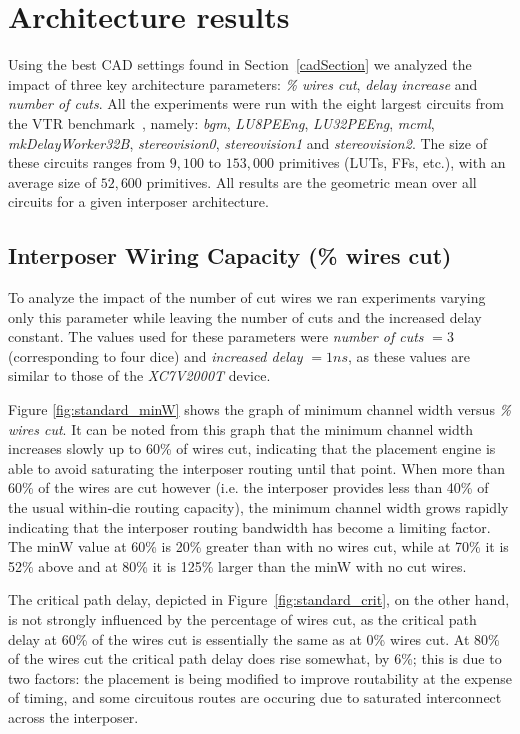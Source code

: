 \documentclass{sig-alternate-2013}
\begin{document}
\section{Architecture results}
\label{resultsSection}

Using the best CAD settings found in Section~\ref{cadSection} we analyzed the impact of three key architecture parameters:  \textit{\% wires cut}, \textit{delay increase} and \textit{number of cuts}. All the experiments were run with the eight largest circuits from the VTR benchmark~\cite{vtr2012}, namely: \textit{bgm}, \textit{LU8PEEng}, \textit{LU32PEEng}, \textit{mcml}, \textit{mkDelayWorker32B}, \textit{stereovision0}, \textit{stereovision1} and \textit{stereovision2}. The size of these circuits ranges from $9,100$ to $153,000$ primitives (LUTs, FFs, etc.), with an average size of $52,600$ primitives. All results are the geometric mean over all circuits for a given interposer architecture.

\subsection{Interposer Wiring Capacity (\% wires cut)}

To analyze the impact of the number of cut wires we ran experiments varying only this parameter while leaving the number of cuts and the increased delay constant. The values used for these parameters were \textit{number of cuts} $= 3$ (corresponding to four dice) and \textit{increased delay} $= 1ns$, as these values are similar to those of the \textit{XC7V2000T} device.

Figure \ref{fig:standard_minW} shows the graph of minimum channel width versus \textit{\% wires cut}. It can be noted from this graph that the minimum channel width increases slowly up to 60\% of wires cut, indicating that the placement engine is able to avoid saturating the interposer routing until that point. When more than 60\% of the wires are cut however (i.e. the interposer provides less than 40\% of the usual within-die routing capacity), the minimum channel width grows rapidly indicating that the interposer routing bandwidth has become a limiting factor. The minW value at 60\% is 20\% greater than with no wires cut, while at 70\% it is 52\% above and at 80\% it is 125\% larger than the minW with no cut wires.

The critical path delay, depicted in Figure~\ref{fig:standard_crit}, on the other hand, is not strongly influenced by the percentage of wires cut, as the critical path delay at 60\% of the wires cut is essentially the same as at 0\% wires cut. At 80\% of the wires cut the critical path delay does rise somewhat, by 6\%; this is due to two factors: the placement is being modified to improve routability at the expense of timing, and some circuitous routes are occuring due to saturated interconnect across the interposer.
\end{document}

